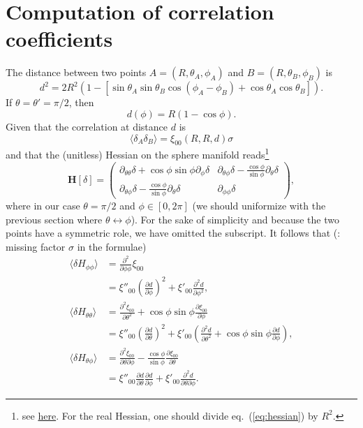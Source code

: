 \documentclass[useAMS,usenatbib,babel,superscriptaddress]{mnras}
\newcommand{\mean}[1]{
  \langle #1
  \rangle}
\def\red{\color{Red}}
\newcommand{\TODO}[1]{{\red{\bf TODO}: #1}}
\begin{document}
\appendix

\section{Computation of correlation coefficients}

The distance between two points $A = (R, \theta_A, \phi_A)$ and $B = (R, \theta_B, \phi_B)$ is
\begin{equation}
  d^2 = 2R^2\left(1-\left[{\sin\theta_A\sin\theta_B}{\cos(\phi_A-\phi_B)}+\cos\theta_A\cos\theta_B\right]\right).
\end{equation}
If $\theta=\theta'=\pi/2$, then
\begin{equation}
  d(\phi) = R(1-\cos\phi).
\end{equation}
Given that the correlation at distance $d$ is
\begin{equation}
  \mean{\delta_A\delta_B} = \xi_{00}(R, R, d) \sigma
\end{equation}
and that the (unitless) Hessian on the sphere manifold reads\footnote{see \href{https://math.stackexchange.com/questions/2036124/hessian-matrix-in-spherical-coordinates}{here}. For the real Hessian, one should divide eq.~(\ref{eq:hessian}) by $R^2$.}
\begin{equation}
  \label{eq:hessian}
  \mathbf{H}[\delta] =
  \begin{pmatrix}
    \partial_{\theta\theta}\delta + \cos\phi\sin\phi\partial_\phi \delta & \partial_{\theta\phi}\delta - \frac{\cos\phi}{\sin\phi}\partial_\theta\delta \\
    \partial_{\theta\phi}\delta - \frac{\cos\phi}{\sin\phi}\partial_\theta\delta & \partial_{\phi\phi}\delta
  \end{pmatrix},
\end{equation}
where in our case $\theta =\pi/2$ and $\phi\in[0, 2\pi]$ (we should uniformize with the previous section where $\theta\leftrightarrow\phi$). For the sake of simplicity and because the two points have a symmetric role, we have omitted the subscript. It follows that (\TODO{missing factor $\sigma$ in the formulae})
\begin{align}
  \mean{\delta H_{\phi\phi}}
  &= \frac{\partial^2}{\partial\phi\phi}\xi_{00} \nonumber \\
  &= \xi''_{00}\left(\frac{\partial d}{\partial \phi}\right)^2 + \xi'_{00}\frac{\partial^2 d}{\partial\phi^2},\\
  \mean{\delta H_{\theta\theta}}
  &= \frac{\partial^2 \xi_{00}}{\partial\theta^2}+\cos\phi\sin\phi \frac{\partial \xi_{00}}{\partial\phi} \nonumber\\
  &= \xi''_{00}\left(\frac{\partial d}{\partial \theta}\right)^2 + \xi'_{00}\left(\frac{\partial^2 d}{\partial\theta^2} + \cos\phi\sin\phi\frac{\partial d}{\partial \phi}\right),\\
  \mean{\delta H_{\theta\phi}}
  & = \frac{\partial^2 \xi_{00}}{\partial\theta\partial\phi}-\frac{\cos\phi}{\sin\phi}\frac{\partial \xi_{00}}{\partial\theta} \nonumber \\
  & = \xi''_{00}\frac{\partial d}{\partial\theta}\frac{\partial d}{\partial\phi} + \xi'_{00}\frac{\partial^2 d}{\partial\theta\partial\phi}.
\end{align}
\end{document}
